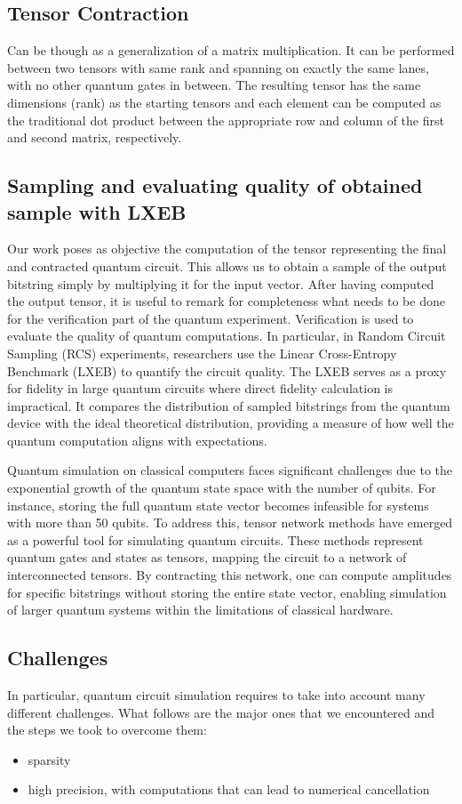 \documentclass[12pt,oneside,a4paper]{article}
\begin{document}
\subsection{Tensor Contraction}
Can be though as a generalization of a matrix multiplication. It can be performed between two tensors with same rank and spanning on exactly the same lanes, with no other quantum gates in between. The resulting tensor has the same dimensions (rank) as the starting tensors and each element can be computed as the traditional dot product between the appropriate row and column of the first and second matrix, respectively.


\subsection{Sampling and evaluating quality of obtained sample with LXEB}
Our work poses as objective the computation of the tensor representing the final and contracted quantum circuit. This allows us to obtain a sample of the output bitstring simply by multiplying it for the input vector. After having computed the output tensor, it is useful to remark for completeness what needs to be done for the verification part of the quantum experiment. Verification is used to evaluate the quality of quantum computations. In particular, in Random Circuit Sampling (RCS) experiments, researchers use the Linear Cross-Entropy Benchmark (LXEB) to quantify the circuit quality. The LXEB serves as a proxy for fidelity in large quantum circuits where direct fidelity calculation is impractical. It compares the distribution of sampled bitstrings from the quantum device with the ideal theoretical distribution, providing a measure of how well the quantum computation aligns with expectations.

Quantum simulation on classical computers faces significant challenges due to the exponential growth of the quantum state space with the number of qubits. For instance, storing the full quantum state vector becomes infeasible for systems with more than 50 qubits. To address this, tensor network methods have emerged as a powerful tool for simulating quantum circuits. These methods represent quantum gates and states as tensors, mapping the circuit to a network of interconnected tensors. By contracting this network, one can compute amplitudes for specific bitstrings without storing the entire state vector, enabling simulation of larger quantum systems within the limitations of classical hardware.

\subsection{Challenges}
In particular, quantum circuit simulation requires to take into account many different challenges. What follows are the major ones that we encountered and the steps we took to overcome them:
\begin{itemize}
    \item sparsity
    \item high precision, with computations that can lead to numerical cancellation
\end{itemize}
\end{document}
